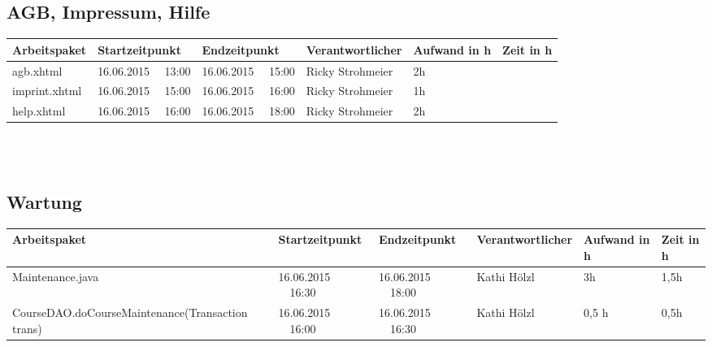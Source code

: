 \begin{landscape}
	\subsection{AGB, Impressum, Hilfe}
	\begin{tabular}{|p{10.3cm}|p{3.2cm}|p{3.2cm}|p{3.5cm}|p{1.7cm}|p{1.5cm}|}
		\hline  \textbf{Arbeitspaket} & \textbf{Startzeitpunkt} & \textbf{Endzeitpunkt} & \textbf{Verantwortlicher}  & \textbf{Aufwand in h} & \textbf{Zeit in h}\\
		\hline   agb.xhtml          & 16.06.2015 \ \ 13:00        & 16.06.2015 \ \ 15:00        & Ricky Strohmeier &  2h                 &\\
		\hline   imprint.xhtml      & 16.06.2015 \ \ 15:00        & 16.06.2015 \ \ 16:00        & Ricky Strohmeier &  1h                 &\\
		\hline   help.xhtml         & 16.06.2015 \ \ 16:00        & 16.06.2015 \ \ 18:00        & Ricky Strohmeier &  2h                 &\\
		\hline 
	\end{tabular} \ \\
	\ \\	
	
	\subsection{Wartung}
	\begin{tabular}{|p{10.3cm}|p{3.2cm}|p{3.2cm}|p{3.5cm}|p{1.7cm}|p{1.5cm}|}
		\hline  \textbf{Arbeitspaket} & \textbf{Startzeitpunkt} & \textbf{Endzeitpunkt} & \textbf{Verantwortlicher}  & \textbf{Aufwand in h} & \textbf{Zeit in h}\\ 
		\hline   Maintenance.java         & 16.06.2015 \ \ 16:30       & 16.06.2015  \ \  18:00        & Kathi Hölzl &  3h  &  1,5h \\
		\hline   CourseDAO.doCourseMaintenance(Transaction trans)         & 16.06.2015 \ \ 16:00       & 16.06.2015  \ \  16:30        & Kathi Hölzl &  0,5 h  &  0,5h \\
		\hline
	\end{tabular}				
\end{landscape}